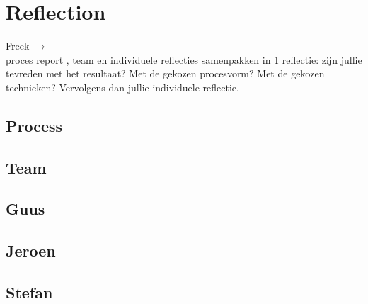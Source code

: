 \chapter{Reflection}
\begin{tcolorbox}[colback=yellow!30]
Freek $\rightarrow$ \\ 
proces report , team en individuele reflecties samenpakken in 1 reflectie: zijn jullie tevreden met het resultaat? Met de gekozen procesvorm? Met de gekozen technieken? Vervolgens dan jullie individuele reflectie.
\end{tcolorbox}
\section{Process}
\section{Team}
\section{Guus}
\section{Jeroen}
\section{Stefan}



